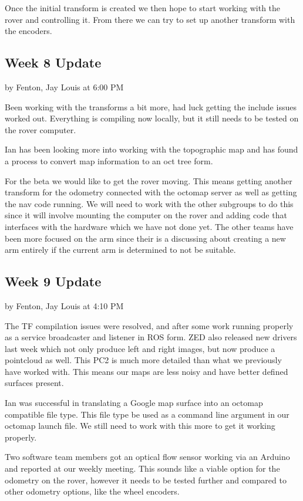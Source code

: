 \documentclass[10pt, oneside,onecolumn]{IEEEtran}
\begin{document}
\begin{titlepage}
Once the initial transform is created we then hope to start working with the rover and controlling it. From there we can try to set up another transform with the encoders.  

\subsection{Week 8 Update}
by Fenton, Jay Louis at 6:00 PM

Been working with the transforms a bit more, had luck getting the include issues worked out. Everything is compiling now locally, but it still needs to be tested on the rover computer. 

Ian has been looking more into working with the topographic map and has found a process to convert map information to an oct tree form. 

For the beta we would like to get the rover moving. This means getting another transform for the odometry connected with the octomap server as well as getting the nav code running. We will need to work with the other subgroups to do this since it will involve mounting the computer on the rover and adding code that interfaces with the hardware which we have not done yet. The other teams have been more focused on the arm since their is a discussing about creating a new arm entirely if the current arm is determined to not be suitable. 

\subsection{Week 9 Update}
by Fenton, Jay Louis at 4:10 PM

The TF compilation issues were resolved, and after some work running properly as a service broadcaster and listener in ROS form. ZED also released new drivers last week which not only produce left and right images, but now produce a pointcloud as well. This PC2 is much more detailed than what we previously have worked with. This means our maps are less noisy and have better defined surfaces present. 

Ian was successful in translating a Google map surface into an octomap compatible file type. This file type be used as a command line argument in our octomap launch file. We still need to work with this more to get it working properly. 

Two software team members got an optical flow sensor working via an Arduino and reported at our weekly meeting. This sounds like a viable option for the odometry on the rover, however it needs to be tested further and compared to other odometry options, like the wheel encoders. 



\end{titlepage}
\end{document}
